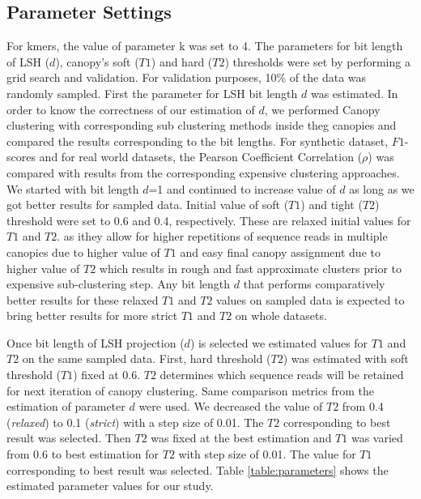 \documentclass[10pt, conference, compsocconf]{IEEEtran}
\begin{document}
\subsection{\textbf{Parameter Settings}}
For kmers, the value of parameter k was set to 4. The parameters for bit length of LSH ($d$), canopy's soft ($T1$) and 
hard ($T2$) thresholds were set by performing a grid search and validation. For validation purposes, 10\%  of the 
data was randomly sampled. First the parameter for LSH bit length $d$ was estimated. In order to know the 
correctness of our estimation of $d$, we performed Canopy clustering with corresponding sub clustering methods 
inside theg 
canopies and compared the results corresponding to the bit lengths. For synthetic dataset, $F1$-scores and for real world datasets, the 
Pearson Coefficient Correlation ($\rho$) was compared 
with results from the 
corresponding expensive  clustering approaches. We started with bit length $d$=1 and continued to increase value of $d$ as long as we 
got better results for sampled data. Initial value of soft ($T1$) and tight ($T2$) threshold  were
set to 0.6 and 0.4, respectively. These are 
relaxed initial values for 
$T1$ and $T2$. 
%
as ithey allow for higher repetitions of sequence reads in multiple canopies due to higher value of $T1$ and easy final canopy assignment due to higher value of $T2$ which results in rough and fast approximate clusters prior to 
expensive sub-clustering step. Any bit length $d$ that performs 
comparatively better results for these relaxed $T1$ and $T2$ values 
on sampled data is expected to bring better results for more strict $T1$ and $T2$ on whole datasets.

Once bit length of LSH projection ($d$) is selected we estimated values for $T1$ and $T2$ on the same sampled data. First, hard threshold ($T2$) was estimated with soft 
threshold ($T1$) fixed at 0.6. $T2$ determines which sequence reads will be retained for next 
iteration of canopy clustering. Same comparison metrics from the estimation of parameter $d$ were used. We decreased the value of $T2$
from 0.4 (\emph{relaxed}) to 0.1 (\emph{strict}) with a step size of 
0.01. The $T2$ corresponding to best result was selected. Then $T2$ was fixed 
at the best estimation and $T1$ was varied from 0.6 to best 
estimation for $T2$ with step size of 0.01. The value for $T1$ corresponding to best 
result was selected. Table \ref{table:parameters} shows the estimated parameter values for our study.   

\end{document}
